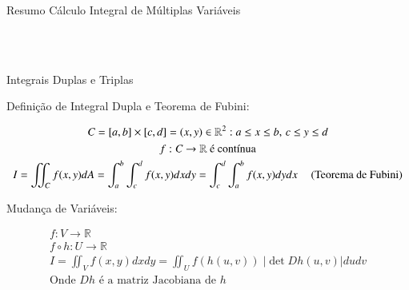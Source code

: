 		\begin{center}
		\begin{Huge}
			Resumo Cálculo Integral de Múltiplas Variáveis
		\end{Huge}\\		
		\hrulefill \vspace{12pt} \\	
		\begin{Large}
			Integrais Duplas e Triplas
		\end{Large}
	\end{center}
	
	\begin{large}
	Definição de Integral Dupla e Teorema de Fubini:
	\end{large}		
	\begin{gather*}
	\mathit{C}=[a,b]\times [c,d] = (x,y)\in\mathbb{R}^2: a\leq x\leq b, \,c \leq y\leq d	\\
	f:\textit{C}\to\mathbb{R} \text{ é contínua}\\
	I=\displaystyle\iint_{\mathit{C}}f(x,y)dA=\displaystyle\int_a^b\displaystyle\int_c^df(x,y)dxdy=
	\displaystyle\int_c^d\displaystyle\int_a^bf(x,y)dydx \text{\hspace{12pt}(Teorema de Fubini)}
	\end{gather*}
	
	\begin{large}
	Mudança de Variáveis:
	\end{large}
	\begin{gather*}
	f:\mathit{V}\to\mathbb{R}\\
	f\circ h: \mathit{U} \to \mathbb{R}\\
	I=\displaystyle\iint_{\mathit{V}}f(x,y)dxdy=\displaystyle\iint_{\mathit{U}}f(h(u,v))\;|\det Dh(u,v)|dudv \\
	\text{Onde $Dh$ é a matriz Jacobiana de $h$}
	\end{gather*}
	
